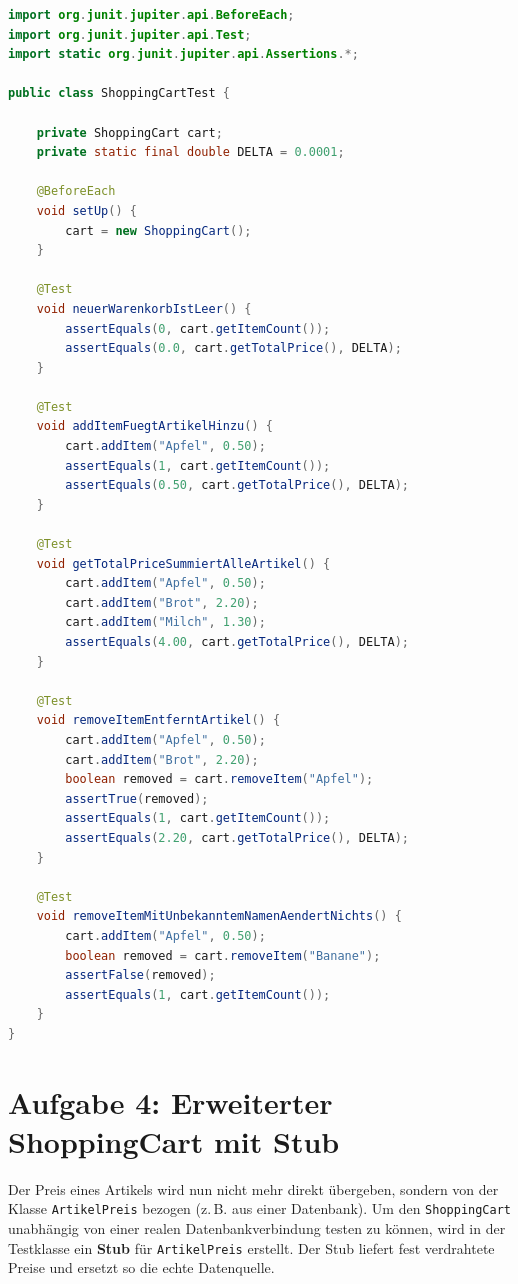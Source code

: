 \documentclass[
	fontsize=12pt,          %
	paper=a4,               %
	numbers=noenddot,       %
	listof=totoc,           %
	listof=entryprefix,     %
	listof=nochaptergap,    %
	bibliography=totoc,     %
	parskip=half,           %
	openany                 %
]{scrbook}
\begin{document}
\begin{lstlisting}[language=Java]
import org.junit.jupiter.api.BeforeEach;
import org.junit.jupiter.api.Test;
import static org.junit.jupiter.api.Assertions.*;

public class ShoppingCartTest {

    private ShoppingCart cart;
    private static final double DELTA = 0.0001;

    @BeforeEach
    void setUp() {
        cart = new ShoppingCart();
    }

    @Test
    void neuerWarenkorbIstLeer() {
        assertEquals(0, cart.getItemCount());
        assertEquals(0.0, cart.getTotalPrice(), DELTA);
    }

    @Test
    void addItemFuegtArtikelHinzu() {
        cart.addItem("Apfel", 0.50);
        assertEquals(1, cart.getItemCount());
        assertEquals(0.50, cart.getTotalPrice(), DELTA);
    }

    @Test
    void getTotalPriceSummiertAlleArtikel() {
        cart.addItem("Apfel", 0.50);
        cart.addItem("Brot", 2.20);
        cart.addItem("Milch", 1.30);
        assertEquals(4.00, cart.getTotalPrice(), DELTA);
    }

    @Test
    void removeItemEntferntArtikel() {
        cart.addItem("Apfel", 0.50);
        cart.addItem("Brot", 2.20);
        boolean removed = cart.removeItem("Apfel");
        assertTrue(removed);
        assertEquals(1, cart.getItemCount());
        assertEquals(2.20, cart.getTotalPrice(), DELTA);
    }

    @Test
    void removeItemMitUnbekanntemNamenAendertNichts() {
        cart.addItem("Apfel", 0.50);
        boolean removed = cart.removeItem("Banane");
        assertFalse(removed);
        assertEquals(1, cart.getItemCount());
    }
}
\end{lstlisting}


\chapter*{Aufgabe 4: Erweiterter ShoppingCart mit Stub}

Der Preis eines Artikels wird nun nicht mehr direkt übergeben, sondern von der
Klasse \texttt{ArtikelPreis} bezogen (z.\,B. aus einer Datenbank). Um den
\texttt{ShoppingCart} unabhängig von einer realen Datenbankverbindung testen zu
können, wird in der Testklasse ein \textbf{Stub} für \texttt{ArtikelPreis}
erstellt. Der Stub liefert fest verdrahtete Preise und ersetzt so die echte
Datenquelle.
\end{document}
